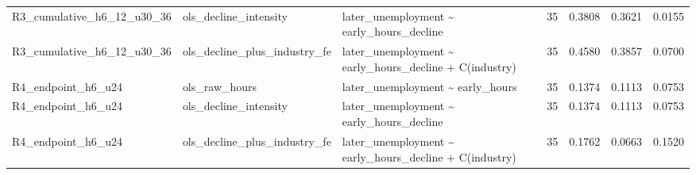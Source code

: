 \begin{table}
\begin{tabular}{lllllll}
R3\_cumulative\_h6\_12\_u30\_36 & ols\_decline\_intensity & later\_unemployment \textasciitilde{} early\_hours\_decline & 35 & 0.3808 & 0.3621 & 0.0155 \\
R3\_cumulative\_h6\_12\_u30\_36 & ols\_decline\_plus\_industry\_fe & later\_unemployment \textasciitilde{} early\_hours\_decline + C(industry) & 35 & 0.4580 & 0.3857 & 0.0700 \\
R4\_endpoint\_h6\_u24 & ols\_raw\_hours & later\_unemployment \textasciitilde{} early\_hours & 35 & 0.1374 & 0.1113 & 0.0753 \\
R4\_endpoint\_h6\_u24 & ols\_decline\_intensity & later\_unemployment \textasciitilde{} early\_hours\_decline & 35 & 0.1374 & 0.1113 & 0.0753 \\
R4\_endpoint\_h6\_u24 & ols\_decline\_plus\_industry\_fe & later\_unemployment \textasciitilde{} early\_hours\_decline + C(industry) & 35 & 0.1762 & 0.0663 & 0.1520 \\
\hline
\end{tabular}
\end{table}
